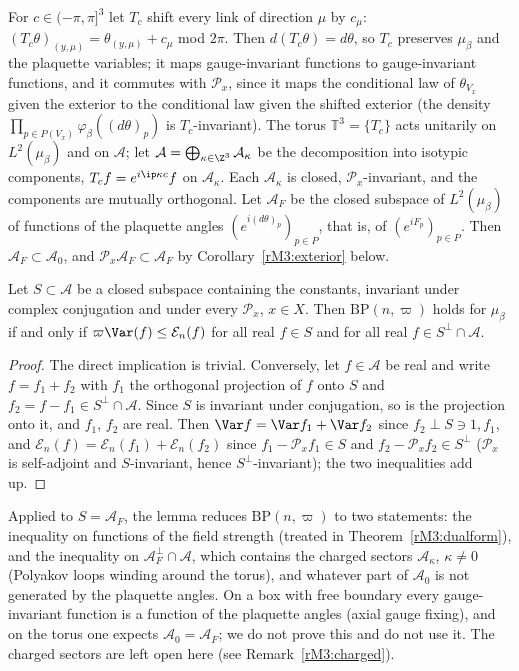 For $c\in(-\pi,\pi]^3$ let $T_c$ shift every link of direction $\mu$ by
$c_\mu$: $(T_c\theta)_{(y,\mu)}=\theta_{(y,\mu)}+c_\mu$ mod $2\pi$. Then
$d(T_c\theta)=d\theta$, so $T_c$ preserves $\mu_\beta$ and the
plaquette variables; it maps gauge-invariant functions to gauge-invariant
functions, and it commutes with $\mathcal P_x$, since it maps the
conditional law of $\theta_{V_x}$ given the exterior to the conditional
law given the shifted exterior (the density $\prod_{p\in P(V_x)}\varphi_\beta
((d\theta)_p)$ is $T_c$-invariant). The torus $\mathbb T^3=\{T_c\}$ acts
unitarily on $L^2(\mu_\beta)$ and on $\mathcal A$; let $\mathcal A=
\bigoplus_{\kappa\in\Z^3}\mathcal A_\kappa$ be the decomposition into
isotypic components, $T_cf=e^{i\ip\kappa c}f$ on $\mathcal A_\kappa$. Each
$\mathcal A_\kappa$ is closed, $\mathcal P_x$-invariant, and the
components are mutually orthogonal. Let $\mathcal A_F$ be the closed
subspace of $L^2(\mu_\beta)$ of functions of the plaquette angles
$(e^{i(d\theta)_p})_{p\in P}$, that is, of $(e^{iF_p})_{p\in P}$.
Then $\mathcal A_F\subset\mathcal A_0$, and $\mathcal P_x\mathcal A_F
\subset\mathcal A_F$ by Corollary~\ref{rM3:exterior} below.

\begin{lemma}[splitting]\label{rM3:split}
Let $S\subset\mathcal A$ be a closed subspace containing the constants,
invariant under complex conjugation and under every $\mathcal P_x$,
$x\in X$. Then $\mathrm{BP}(n,\varpi)$
holds for $\mu_\beta$ if and only if $\varpi\Var(f)\le\mathcal E_n(f)$
for all real $f\in S$ and for all real $f\in S^\perp\cap\mathcal A$.
\end{lemma}

\begin{proof}
The direct implication is trivial. Conversely, let $f\in\mathcal A$ be
real and write $f=f_1+f_2$ with $f_1$ the orthogonal projection of $f$ onto
$S$ and $f_2=f-f_1\in S^\perp\cap\mathcal A$. Since $S$ is invariant
under conjugation, so is the projection onto it, and $f_1$, $f_2$ are real.
Then $\Var f=\Var f_1+\Var f_2$ since $f_2\perp S\ni1,f_1$, and
$\mathcal E_n(f)=\mathcal E_n(f_1)+\mathcal E_n(f_2)$ since
$f_1-\mathcal P_xf_1\in S$ and $f_2-\mathcal P_xf_2\in S^\perp$
($\mathcal P_x$ is self-adjoint and $S$-invariant, hence
$S^\perp$-invariant); the two inequalities add up.
\end{proof}

Applied to $S=\mathcal A_F$, the lemma reduces $\mathrm{BP}(n,\varpi)$ to
two statements: the inequality on functions of the field strength
(treated in Theorem~\ref{rM3:dualform}), and the inequality on
$\mathcal A_F^\perp\cap\mathcal A$, which contains the charged sectors
$\mathcal A_\kappa$, $\kappa\ne0$ (Polyakov loops winding around the
torus), and whatever part of $\mathcal A_0$ is not generated by the
plaquette angles. On a box with free boundary every gauge-invariant
function is a function of the plaquette angles (axial gauge fixing), and
on the torus one expects $\mathcal A_0=\mathcal A_F$; we do not prove
this and do not use it. The charged sectors are left open here (see
Remark~\ref{rM3:charged}).
